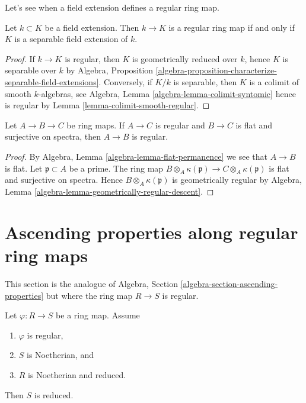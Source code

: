 \noindent
Let's see when a field extension defines a regular ring map.

\begin{lemma}
\label{lemma-regular-field-extension}
Let $k \subset K$ be a field extension. Then $k \to K$ is a regular
ring map if and only if $K$ is a separable field extension of $k$.
\end{lemma}

\begin{proof}
If $k \to K$ is regular, then $K$ is geometrically reduced over $k$,
hence $K$ is separable over $k$ by
Algebra, Proposition
\ref{algebra-proposition-characterize-separable-field-extensions}.
Conversely, if $K/k$ is separable, then $K$ is a colimit of smooth
$k$-algebras, see
Algebra, Lemma \ref{algebra-lemma-colimit-syntomic}
hence is regular by
Lemma \ref{lemma-colimit-smooth-regular}.
\end{proof}

\begin{lemma}
\label{lemma-regular-permanence}
Let $A \to B \to C$ be ring maps. If $A \to C$ is regular and $B \to C$
is flat and surjective on spectra, then $A \to B$ is regular.
\end{lemma}

\begin{proof}
By Algebra, Lemma \ref{algebra-lemma-flat-permanence} we see that
$A \to B$ is flat. Let $\mathfrak p \subset A$ be a prime. The ring
map $B \otimes_A \kappa(\mathfrak p) \to C \otimes_A \kappa(\mathfrak p)$
is flat and surjective on spectra. Hence $B \otimes_A \kappa(\mathfrak p)$
is geometrically regular by
Algebra, Lemma \ref{algebra-lemma-geometrically-regular-descent}.
\end{proof}




\section{Ascending properties along regular ring maps}
\label{section-ascending-properties}

\noindent
This section is the analogue of
Algebra, Section \ref{algebra-section-ascending-properties}
but where the ring map $R \to S$ is regular.

\begin{lemma}
\label{lemma-reduced-goes-up}
Let $\varphi : R \to S$ be a ring map. Assume
\begin{enumerate}
\item $\varphi$ is regular,
\item $S$ is Noetherian, and
\item $R$ is Noetherian and reduced.
\end{enumerate}
Then $S$ is reduced.
\end{lemma}

